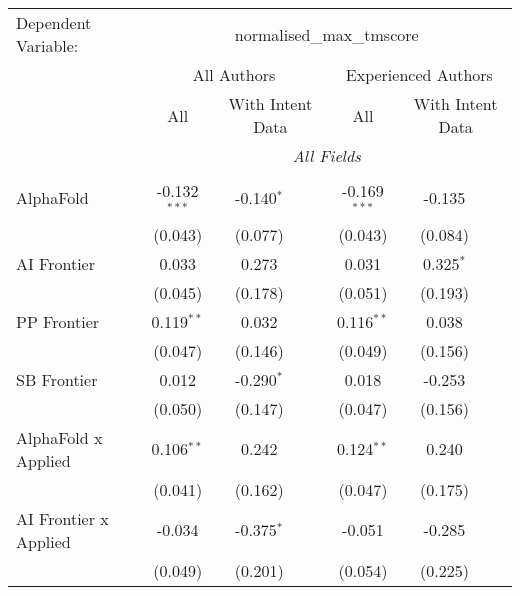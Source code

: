 \begingroup
\centering
\begin{tabular}{lcccccc}
   \tabularnewline \midrule \midrule
   Dependent Variable: & \multicolumn{6}{c}{normalised\_max\_tmscore}\\
 & \multicolumn{3}{c}{All Authors} & \multicolumn{3}{c}{Experienced Authors} \\
\cmidrule(lr){2-4} \cmidrule(lr){5-7}
 & \multicolumn{1}{c}{All} & \multicolumn{2}{c}{With Intent Data} & \multicolumn{1}{c}{All} & \multicolumn{2}{c}{With Intent Data} \\
\cmidrule(lr){2-2} \cmidrule(lr){3-4} \cmidrule(lr){5-5} \cmidrule(lr){6-7}
 & \multicolumn{6}{c}{\textit{All Fields}} \\ \\
   AlphaFold                      & -0.132$^{***}$ & -0.140$^{*}$ &                & -0.169$^{***}$ & -0.135      &   \\   
                                  & (0.043)        & (0.077)      &                & (0.043)        & (0.084)     &   \\   
   AI Frontier                    & 0.033          & 0.273        &                & 0.031          & 0.325$^{*}$ &   \\   
                                  & (0.045)        & (0.178)      &                & (0.051)        & (0.193)     &   \\   
   PP Frontier                    & 0.119$^{**}$   & 0.032        &                & 0.116$^{**}$   & 0.038       &   \\   
                                  & (0.047)        & (0.146)      &                & (0.049)        & (0.156)     &   \\   
   SB Frontier                    & 0.012          & -0.290$^{*}$ &                & 0.018          & -0.253      &   \\   
                                  & (0.050)        & (0.147)      &                & (0.047)        & (0.156)     &   \\   
   AlphaFold x Applied            & 0.106$^{**}$   & 0.242        &                & 0.124$^{**}$   & 0.240       &   \\   
                                  & (0.041)        & (0.162)      &                & (0.047)        & (0.175)     &   \\   
   AI Frontier x Applied          & -0.034         & -0.375$^{*}$ &                & -0.051         & -0.285      &   \\   
                                  & (0.049)        & (0.201)      &                & (0.054)        & (0.225)     &   \\   

\end{tabular}
